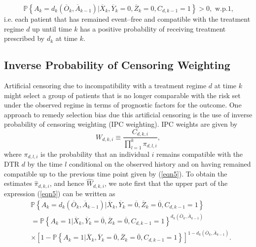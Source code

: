 \documentclass[12pt]{article}
\begin{document}
\begin{equation*}
\mathbb{P} \left\lbrace A_k = d_k \left( \overline{O}_k,  \overline{A}_{k-1} \right) \vert \overline{X}_k, \overline{Y}_k = 0, \overline{Z}_k = 0,  C_{d,k-1} = 1 \right\rbrace > 0, \text{ w.p.1,}  
\end{equation*}
i.e. each patient that has remained event--free and compatible with the treatment regime $d$ up until time $k$ has a positive probability of receiving treatment prescribed by $d_k$ at time $k$.  

\subsection{Inverse Probability of Censoring Weighting}

Artificial censoring due to incompatibility with a treatment regime $d$ at time $k$ might select a group of patients that is no longer comparable with the risk set under the observed regime in terms of prognostic factors for the outcome. One approach to remedy selection bias due this artificial censoring is the use of inverse probability of censoring weighting (IPC weighting). IPC weights are given by
\begin{equation}
\label{eqn6}
W_{d,k,i} \equiv \frac{C_{d,k,i}}{ \prod_{l=1}^k \pi_{d,l,i}},
\end{equation}
where $\pi_{d,l,i}$ is the probability that an individual $i$ remains compatible with the DTR $d$ by the time $l$ conditional on the observed history and on having remained compatible up to the previous time point given by (\ref{eqn5}). To obtain the estimates $\hat{\pi}_{d,k,i}$, and hence $\hat{W}_{d,k,i}$, we note first that the upper part of the expression (\ref{eqn5}) can be written as
\begin{align*}
&\mathbb{P} \left\lbrace A_k = d_k \left( \overline{O}_k, \overline{A}_{k-1} \right) \vert \overline{X}_k,  \overline{Y}_k = \overline{0}, \overline{Z}_k = \overline{0}, C_{d,k-1} = 1 \right\rbrace \\
&=\mathbb{P} \left\lbrace A_k = 1 \vert \overline{X}_k,  \overline{Y}_k = \overline{0}, \overline{Z}_k = \overline{0}, C_{d,k-1} = 1 \right\rbrace^{d_k \left( \overline{O}_k, \overline{A}_{k-1} \right)} \\
&\times \left[ 1-\mathbb{P} \left\lbrace A_k = 1 \vert \overline{X}_k,  \overline{Y}_k = \overline{0}, \overline{Z}_k = \overline{0}, C_{d,k-1} = 1 \right\rbrace \right]^{1-d_k \left( \overline{O}_k, \overline{A}_{k-1} \right)}.
\end{align*}
\end{document}
